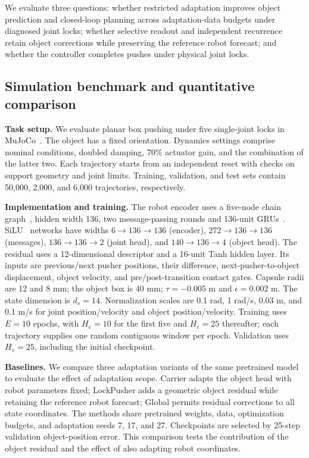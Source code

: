 We evaluate three questions: whether restricted adaptation improves object prediction and closed-loop planning across adaptation-data budgets under diagnosed joint locks; whether selective readout and independent recurrence retain object corrections while preserving the reference robot forecast; and whether the controller completes pushes under physical joint locks.




\subsection{Simulation benchmark and quantitative comparison}
\noindent\hspace*{1em}\textbf{Task setup.} We evaluate planar box pushing under five single-joint locks in MuJoCo~\cite{todorov2012mujoco}. The object has a fixed orientation. Dynamics settings comprise nominal conditions, doubled damping, 70\% actuator gain, and the combination of the latter two. Each trajectory starts from an independent reset with checks on support geometry and joint limits. Training, validation, and test sets contain 50,000, 2,000, and 6,000 trajectories, respectively.

\noindent\hspace*{1em}\textbf{Implementation and training.} The robot encoder uses a five-node chain graph~\cite{battaglia2016interaction,sanchezgonzalez2020learning}, hidden width 136, two message-passing rounds and 136-unit GRUs~\cite{cho2014gru}. SiLU~\cite{elfwing2018silu} networks have widths $6\to136\to136$ (encoder), $272\to136\to136$ (messages), $136\to136\to2$ (joint head), and $140\to136\to4$ (object head). The residual uses a 12-dimensional descriptor and a 16-unit Tanh hidden layer. Its inputs are previous/next pusher positions, their difference, next-pusher-to-object displacement, object velocity, and pre/post-transition contact gates. Capsule radii are 12 and 8 mm; the object box is 40 mm; $\tau=-0.005$ m and $\epsilon=0.002$ m. The state dimension is $d_s=14$. Normalization scales are 0.1 rad, 1 rad/s, 0.03 m, and 0.1 m/s for joint position/velocity and object position/velocity. Training uses $E=10$ epochs, with $H_e=10$ for the first five and $H_e=25$ thereafter; each trajectory supplies one random contiguous window per epoch. Validation uses $H_v=25$, including the initial checkpoint.

\noindent\hspace*{1em}\textbf{Baselines.} We compare three adaptation variants of the same pretrained model to evaluate the effect of adaptation scope. Carrier adapts the object head with robot parameters fixed; LockPusher adds a geometric object residual while retaining the reference robot forecast; Global permits residual corrections to all state coordinates. The methods share pretrained weights, data, optimization budgets, and adaptation seeds 7, 17, and 27. Checkpoints are selected by 25-step validation object-position error. This comparison tests the contribution of the object residual and the effect of also adapting robot coordinates.

